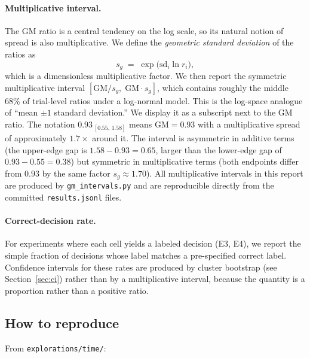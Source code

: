 \documentclass[11pt]{article}
\newcommand{\code}[1]{\texttt{\small #1}}
\newcommand{\gmci}[3]{$#1_{\,[#2,\,#3]}$}
\begin{document}
\paragraph{Multiplicative interval.} The GM ratio is a central tendency on the
log scale, so its natural notion of spread is also multiplicative. We define the
\emph{geometric standard deviation} of the ratios as
\[
s_g \;=\; \exp\!\Big(\mathrm{sd}_i \ln r_i\Big),
\]
which is a dimensionless multiplicative factor. We then report the symmetric multiplicative
interval $[\mathrm{GM} / s_g, \; \mathrm{GM} \cdot s_g]$, which contains roughly the middle
68\% of trial-level ratios under a log-normal model. This is the log-space analogue of
``mean $\pm 1$ standard deviation.'' We display it as a subscript next to the GM ratio. The
notation \gmci{0.93}{0.55}{1.58} means $\mathrm{GM} = 0.93$ with a multiplicative spread of
approximately $1.7\times$ around it. The interval is asymmetric in additive terms (the
upper-edge gap is $1.58 - 0.93 = 0.65$, larger than the lower-edge gap of $0.93 - 0.55 = 0.38$)
but symmetric in multiplicative terms (both endpoints differ from $0.93$ by the same factor
$s_g \approx 1.70$). All multiplicative intervals in this report are produced by
\code{gm\_intervals.py} and are reproducible directly from the committed
\code{results.jsonl} files.

\paragraph{Correct-decision rate.} For experiments where each cell yields a labeled decision
(E3, E4), we report the simple fraction of decisions whose label matches a pre-specified
correct label. Confidence intervals for these rates are produced by cluster bootstrap (see
Section~\ref{sec:ci}) rather than by a multiplicative interval, because the quantity is a
proportion rather than a positive ratio.

\subsection{How to reproduce}
\label{sec:reproduce}

From \code{explorations/time/}:
\end{document}
